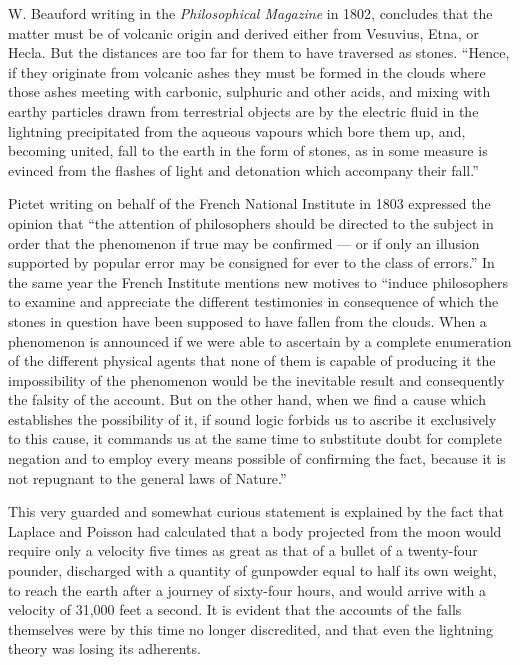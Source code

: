 \documentclass[a4paper, 12pt, oneside]{article}
\begin{document}
W. Beauford writing in the \emph{Philosophical Magazine} in 1802, concludes that the matter must be of volcanic origin and derived either from Vesuvius, Etna, or Hecla. But the distances are too far for them to have traversed as stones. ``Hence, if they originate from volcanic ashes they must be formed in the clouds where those ashes meeting with carbonic, sulphuric and other acids, and mixing with earthy particles drawn from terrestrial objects are by the electric fluid in the lightning precipitated from the aqueous vapours which bore them up, and, becoming united, fall to the earth in the form of stones, as in some measure is evinced from the flashes of light and detonation which accompany their fall.'' 

Pictet writing on behalf of the French National Institute in 1803 expressed the opinion that ``the attention of philosophers should be directed to the subject in order that the phenomenon if true may be confirmed --- or if only an illusion supported by popular error may be consigned for ever to the class of errors.'' In the same year the French Institute mentions new motives to ``induce philosophers to examine and appreciate the different testimonies in consequence of which the stones in question have been supposed to have fallen from the clouds. When a phenomenon is announced if we were able to ascertain by a complete enumeration of the different physical agents that none of them is capable of producing it the impossibility of the phenomenon would be the inevitable result and consequently the falsity of the account. But on the other hand, when we find a cause which establishes the possibility of it, if sound logic forbids us to ascribe it exclusively to this cause, it commands us at the same time to substitute doubt for complete negation and to employ every means possible of confirming the fact, because it is not repugnant to the general laws of Nature.'' 

This very guarded and somewhat curious statement is explained by the fact that Laplace and Poisson had calculated that a body projected from the moon would require only a velocity five times as great as that of a bullet of a twenty-four pounder, discharged with a quantity of gunpowder equal to half its own weight, to reach the earth after a journey of sixty-four hours, and would arrive with a velocity of 31,000 feet a second. It is evident that the accounts of the falls themselves were by this time no longer discredited, and that even the lightning theory was losing its adherents. 
\end{document}
